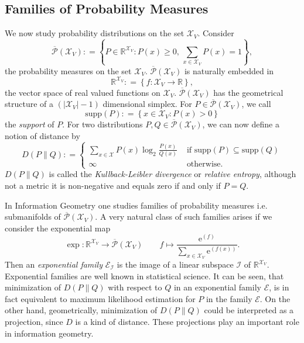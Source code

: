 \documentclass[12pt]{amsart}
\newcommand{\set}[1]{\left\lbrace #1 \right\rbrace} %
\newcommand{\defas}{\mathrel{\mathop{:}}=}   %
\renewcommand{\subset}{\subseteq}  %
\newcommand{\e}{\mathrm{e}} %
\theoremstyle{plain}%
\theoremstyle{definition}
\theoremstyle{remark}
\begin{document}
\subsection{Families of Probability Measures} 
We now study probability distributions on the set
$\mathcal{X}_V$. Consider 
\[
\overline{\mathcal{P}}(\mathcal{X}_V)
\defas \set{P \in \mathbb{R}^{\mathcal{X}_V} : P(x) \geq 0,\,
  \sum_{x\in\mathcal{X}_V} P(x) = 1},
\]  
the probability measures on
the set $\mathcal{X}_V$.
$\overline{\mathcal{P}}(\mathcal{X}_V)$ is naturally embedded in
\[
\mathbb{R}^{\mathcal{X}_V} \defas \set{f : \mathcal{X}_V \to \mathbb{R}},
\] the vector space of real valued functions on $\mathcal{X}_V$.
$\overline{\mathcal{P}}(\mathcal{X}_V)$ has the geometrical structure of a
$(|\mathcal{X}_V| -1)$ dimensional simplex. For $P\in
\overline{\mathcal{P}}(\mathcal{X}_V)$, we call \[ \mbox{supp}(P) \defas
\set{x \in \mathcal{X}_V : P(x) > 0} \] the \emph{support} of
$P$. For two distributions $P,Q \in \overline{\mathcal{P}}(\mathcal{X}_V)$,
we can now define a notion of distance by
\begin{equation*}
  D(P\parallel Q ) \defas \left\lbrace 
  \begin{array}{ll}
    \sum_{x\in\mathcal{X}} P(x) \log_2
    \frac{P(x)}{Q(x)} & \mbox{ if } \mbox{supp}(P) \subset
    \mbox{supp}(Q) \\ 
    \infty & \mbox{ otherwise}.
  \end{array} \right.
\end{equation*}
$D(P\parallel Q)$ is called the \emph{Kullback-Leibler divergence} or
\emph{relative entropy}, although not a metric it is non-negative and
equals zero if and only if $P=Q$. 

In Information Geometry one studies families of probability
measures i.e. submanifolds of $\overline{\mathcal{P}}(\mathcal{X}_V)$. A
very natural class of such families arises if we consider the
exponential map
\begin{equation*}
  \exp : \mathbb{R}^{\mathcal{X}_V} \to \overline{\mathcal{P}}(\mathcal{X}_V) 
  \qquad f \mapsto \frac{\e^{(f)}}{\sum_{x\in\mathcal{X}_V} \e^{(f(x))}}.
\end{equation*}
Then an \emph{exponential family} $\mathcal{E}_\mathcal{I}$ is the
image of a linear subspace $\mathcal{I}$ of $\mathbb{R}^{\mathcal{X}_V}$.
Exponential families are well known in statistical science. It can
be seen, that minimization of $D(P\parallel Q)$ with respect to $Q$
in an exponential family $\mathcal{E}$, is in fact equivalent to maximum
likelihood estimation for $P$ in the family $\mathcal{E}$. On the
other hand, geometrically, minimization of $D(P\parallel Q)$ could be
interpreted as a projection, since $D$ is a kind of distance. These projections 
play an important role in information geometry. 
\end{document}
